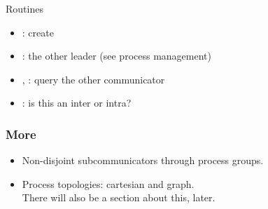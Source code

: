 \begin{mpithree}
\begin{frame}[containsverbatim]{Routines}
  \label{sl:intercomm-routines}
  \begin{itemize}
  \item
    : create
  \item {}: the other leader (see process management)
  \item {}, :
    query the other communicator
  \item {}: is this an inter or intra?
  \end{itemize}
\end{frame}
\end{mpithree}

\begin{frame}[containsverbatim]\frametitle{More}
  \begin{itemize}
  \item Non-disjoint subcommunicators through process groups.
  \item Process topologies: cartesian and graph.\\
    There will also be a section about this, later.
  \end{itemize}
\end{frame}

\endinput

\begin{frame}[containsverbatim]\frametitle{}
\begin{lstlisting}
  
\end{lstlisting}
\end{frame}

